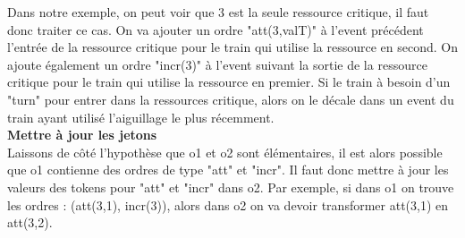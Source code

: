 \documentclass[runningheads]{llncs}
\newcommand{\tuple}[1]{\ensuremath{\langle #1\rangle}}
\begin{document}

%		
%
%
\noindent
Dans notre exemple, on peut voir que 3 est la seule ressource critique, il faut donc traiter ce cas.
On va ajouter un ordre "att(3,valT)" à l'event précédent l'entrée de la ressource critique pour le train qui utilise la ressource en second.
On ajoute également un ordre "incr(3)" à l'event suivant la sortie de la ressource critique pour le train qui utilise la ressource en premier.
Si le train à besoin d'un "turn" pour entrer dans la ressources critique, alors on le décale dans un event du train ayant utilisé l'aiguillage le plus récemment.
\\\textbf{Mettre à jour les jetons}\\
Laissons de côté l'hypothèse que o1 et o2 sont élémentaires, il est alors possible que o1 contienne des ordres de type "att" et "incr". Il faut donc mettre à jour les valeurs
des tokens pour "att" et "incr" dans o2. Par exemple, si dans o1 on trouve les ordres : (att(3,1), incr(3)), alors dans o2 on va devoir transformer att(3,1) en att(3,2).
\end{document}
